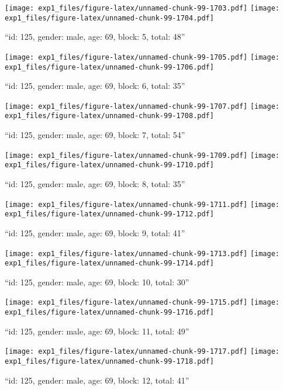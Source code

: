 \documentclass[,]{article}
\begin{document}
\texttt{[image: exp1\_files/figure-latex/unnamed-chunk-99-1703.pdf]}
\texttt{[image: exp1\_files/figure-latex/unnamed-chunk-99-1704.pdf]}

\newpage
[1] 

``id: 125, gender: male, age: 69, block: 5, total: 48''

\texttt{[image: exp1\_files/figure-latex/unnamed-chunk-99-1705.pdf]}
\texttt{[image: exp1\_files/figure-latex/unnamed-chunk-99-1706.pdf]}

\newpage
[1] 

``id: 125, gender: male, age: 69, block: 6, total: 35''

\texttt{[image: exp1\_files/figure-latex/unnamed-chunk-99-1707.pdf]}
\texttt{[image: exp1\_files/figure-latex/unnamed-chunk-99-1708.pdf]}

\newpage
[1] 

``id: 125, gender: male, age: 69, block: 7, total: 54''

\texttt{[image: exp1\_files/figure-latex/unnamed-chunk-99-1709.pdf]}
\texttt{[image: exp1\_files/figure-latex/unnamed-chunk-99-1710.pdf]}

\newpage
[1] 

``id: 125, gender: male, age: 69, block: 8, total: 35''

\texttt{[image: exp1\_files/figure-latex/unnamed-chunk-99-1711.pdf]}
\texttt{[image: exp1\_files/figure-latex/unnamed-chunk-99-1712.pdf]}

\newpage
[1] 

``id: 125, gender: male, age: 69, block: 9, total: 41''

\texttt{[image: exp1\_files/figure-latex/unnamed-chunk-99-1713.pdf]}
\texttt{[image: exp1\_files/figure-latex/unnamed-chunk-99-1714.pdf]}

\newpage
[1] 

``id: 125, gender: male, age: 69, block: 10, total: 30''

\texttt{[image: exp1\_files/figure-latex/unnamed-chunk-99-1715.pdf]}
\texttt{[image: exp1\_files/figure-latex/unnamed-chunk-99-1716.pdf]}

\newpage
[1] 

``id: 125, gender: male, age: 69, block: 11, total: 49''

\texttt{[image: exp1\_files/figure-latex/unnamed-chunk-99-1717.pdf]}
\texttt{[image: exp1\_files/figure-latex/unnamed-chunk-99-1718.pdf]}

\newpage
[1] 

``id: 125, gender: male, age: 69, block: 12, total: 41''
\end{document}
